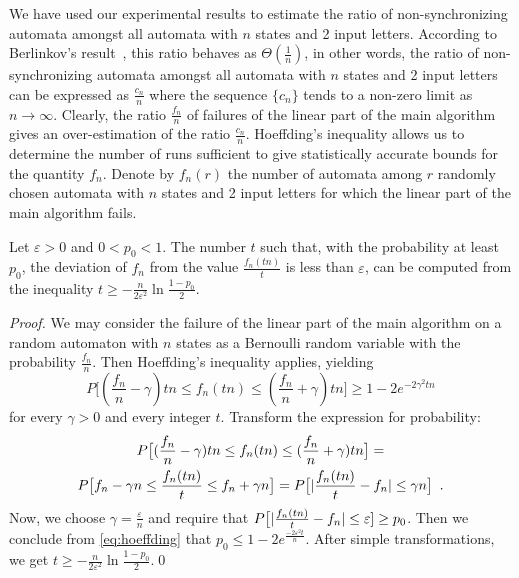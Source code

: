 \documentclass{llncs}
\DeclarePairedDelimiter\abs{\lvert}{\rvert}%
\begin{document}
We have used our experimental results to estimate the ratio of non-synchro\-niz\-ing automata amongst all automata with $n$ states and 2 input letters. According to Berlinkov's result~\cite[Theorem~1]{Berlinkov:preprint}, this ratio behaves as $\Theta(\frac{1}{n})$, in other words, the ratio of non-synchronizing automata amongst all automata with $n$ states and 2 input letters can be expressed as $\frac{c_n}n$ where the sequence $\{c_n\}$ tends to a non-zero limit as $n\to\infty$. Clearly, the ratio $\frac{f_n}n$ of failures of the linear part of the main algorithm gives an over-estimation of the ratio $\frac{c_n}n$. Hoeffding's inequality \cite{hoeffding} allows us to determine the number of runs sufficient to give statistically accurate bounds for the quantity $f_n$. Denote by $f_n(r)$ the number of automata among $r$ randomly chosen automata with $n$ states and 2 input letters for which the linear part of the main algorithm fails.

\begin{proposition}
\label{prop:estimation}
Let $\varepsilon>0$ and $0<p_0<1$. The number $t$ such that, with the probability at least $p_0$, the deviation of $f_n$ from the value $\frac{f_n(t n)}{t}$ is less than $\varepsilon$, can be computed from the inequality  $t\ge-\frac{n}{2\varepsilon^2}\ln{\frac{1-p_0}{2}}$.
\end{proposition}

\begin{proof}
We may consider the failure of the linear part of the main algorithm on a random automaton with $n$ states as a Bernoulli random variable with the probability $\frac{f_n}{n}$. Then Hoeffding's inequality applies, yielding
\begin{equation}
\label{eq:hoeffding}
P\big[(\frac{f_n}{n} - \gamma)t n \le f_n(t n) \le (\frac{f_n}{n} + \gamma)t n\big] \ge 1 - 2e^{-2 \gamma^2 tn}
\end{equation}
for every $\gamma>0$ and every integer $t$. Transform the expression for probability: 
\begin{multline*}
P\big[(\frac{f_n}{n} - \gamma)t n \le f_n(t n) \le (\frac{f_n}{n} + \gamma)t n\big] =\\ 
P\big[f_n - \gamma n \le \frac{f_n(t n)}{t} \le f_n + \gamma n\big] = P\big[\abs{\frac{f_n(t n)}{t} - f_n} \le \gamma n\big]\enspace.
\end{multline*} 
Now, we choose $\gamma=\frac{\varepsilon}n$ and require that $P\big[\abs{\frac{f_n(t n)}{t} - f_n} \le \varepsilon] \ge p_0$. Then we conclude from \eqref{eq:hoeffding} that $p_0 \le 1 - 2e^{\frac{-2\varepsilon^2t}{n}}$. After simple transformations, we get $t \geq -\frac{n}{2 \varepsilon^2} \ln{\frac{1-p_0}{2}}$.\qed
\end{proof}
\end{document}
